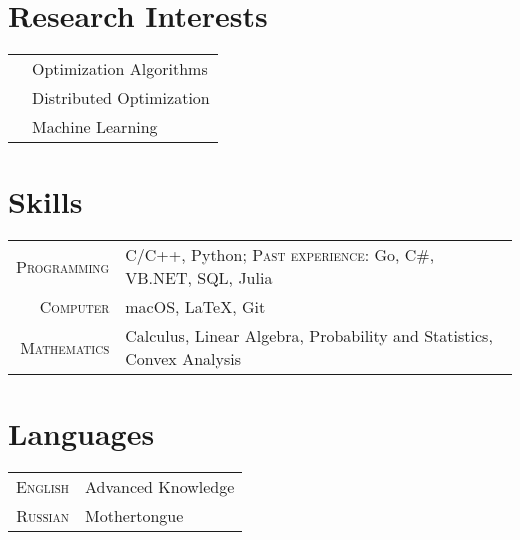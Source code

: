 \section{Research Interests}
\begin{tabular}{cl}
	\qquad\qquad&  Optimization Algorithms\\
	&  Distributed Optimization\\
	&  Machine Learning
\end{tabular}

\section{Skills}

\begin{tabular}{rl}
	\textsc{Programming} & C/C++, Python; \textsc{Past experience:} Go, C\#, VB.NET, SQL, Julia\\
	\textsc{Computer} & macOS, LaTeX, Git\\
	\textsc{Mathematics} & Calculus, Linear Algebra, Probability and Statistics, Convex Analysis\\
\end{tabular}

\section{Languages}

\begin{tabular}{rl}
	\textsc{English} & Advanced Knowledge \\
	\textsc{Russian} & Mothertongue\\
\end{tabular}